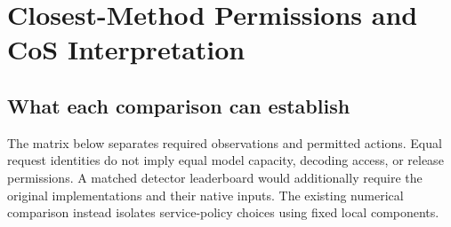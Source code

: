 \documentclass[journal,onecolumn]{IEEEtran}
\begin{document}
\clearpage
\section{Closest-Method Permissions and CoS Interpretation}
\label{sec:s24}
\subsection{What each comparison can establish}
The matrix below separates required observations and permitted actions. Equal request identities do not imply equal model capacity, decoding access, or release permissions. A matched detector leaderboard would additionally require the original implementations and their native inputs. The existing numerical comparison instead isolates service-policy choices using fixed local components.
\end{document}
